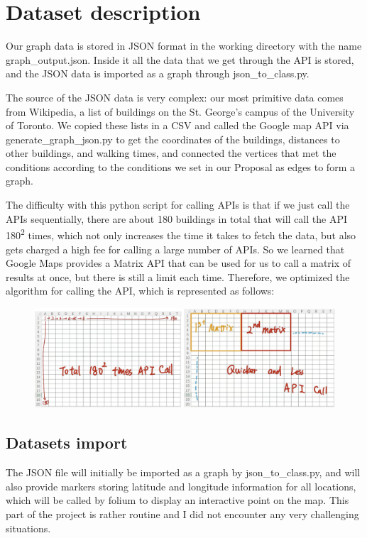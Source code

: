 \documentclass[12pt]{article}
\begin{document}
	\section*{Dataset description}
	Our graph data is stored in JSON format in the working directory with the name graph\_output.json. Inside it all the data that we get through the API is stored, and the JSON data is imported as a graph through json\_to\_class.py.
	
	The source of the JSON data is very complex: our most primitive data comes from Wikipedia, a list of buildings on the St. George's campus of the University of Toronto\cite{noauthor_list_2024}. We copied these lists in a CSV and called the Google map API via generate\_graph\_json.py to get the coordinates of the buildings, distances to other buildings, and walking times, and connected the vertices that met the conditions according to the conditions we set in our Proposal as edges to form a graph.
	
	The difficulty with this python script for calling APIs is that if we just call the APIs sequentially, there are about 180 buildings in total that will call the API 180\textsuperscript{2} times, which not only increases the time it takes to fetch the data, but also gets charged a high fee for calling a large number of APIs. So we learned that Google Maps provides a Matrix API that can be used for us to call a matrix of results at once, but there is still a limit each time. Therefore, we optimized the algorithm for calling the API, which is represented as follows:
	\begin{figure}[h]
	    \centering
	    \includegraphics[width=0.9\linewidth]{image.png}
	    \label{Old VS New}
	\end{figure}
   
	
	\subsection*{Datasets import}
	The JSON file will initially be imported as a graph by json\_to\_class.py, and will also provide markers storing latitude and longitude information for all locations, which will be called by folium to display an interactive point on the map.
	This part of the project is rather routine and I did not encounter any very challenging situations.
	
\end{document}

